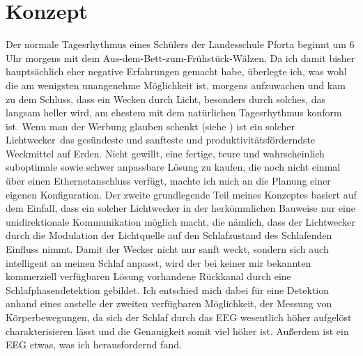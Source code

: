 \documentclass[12pt,a4paper,notitlepage]{article}
\begin{document}
\section{Konzept}
Der normale Tagesrhythmus eines Schülers der Landesschule Pforta beginnt um 6 Uhr morgens mit dem Aus-dem-Bett-zum-Frühstück-Wälzen. Da ich damit bisher hauptsächlich eher negative Erfahrungen gemacht habe, überlegte ich, was wohl die am wenigsten unangenehme Möglichkeit ist, morgens aufzuwachen und kam zu dem Schluss, dass ein Wecken durch Licht, besonders durch solches, das langsam heller wird, am ehestem mit dem natürlichen Tagesrhythmus konform ist. Wenn man der Werbung glauben schenkt (siehe \cite{WERBUNG1}\cite{WERBUNG2}\cite{WERBUNG3}\cite{WERBUNG4}\cite{WERBUNG5}\cite{WERBUNG6}\cite{WERBUNG7}\cite{WERBUNG8})
ist ein solcher \glqq Lichtwecker\grqq\ das gesündeste und sanfteste und produktivitätsförderndste Weckmittel auf Erden\cite{SIESTA1}. Nicht gewillt, eine fertige, teure und wahrscheinlich suboptimale sowie schwer anpassbare Lösung zu kaufen, die noch nicht einmal über einen Ethernetanschluss verfügt, machte ich mich an die Planung einer eigenen Konfiguration. Der zweite grundlegende Teil meines Konzeptes basiert auf dem Einfall, dass ein solcher Lichtwecker in der herkömmlichen Bauweise nur eine unidirektionale Kommunikation möglich macht, die nämlich, dass der Lichtwecker durch die Modulation der Lichtquelle auf den Schlafzustand des Schlafenden Einfluss nimmt. Damit der Wecker nicht nur sanft weckt, sondern sich auch intelligent an meinen Schlaf anpasst, wird der bei keiner mir bekannten kommerziell verfügbaren Lösung vorhandene Rückkanal durch eine Schlafphasendetektion gebildet. Ich entschied mich dabei für eine Detektion anhand eines  anstelle der zweiten verfügbaren Möglichkeit, der Messung von Körperbewegungen, da sich der Schlaf durch das EEG wesentlich höher aufgelöst charakterisieren lässt und die Genauigkeit somit viel höher ist. Außerdem ist ein EEG etwas, was ich herausfordernd fand.

\end{document}
